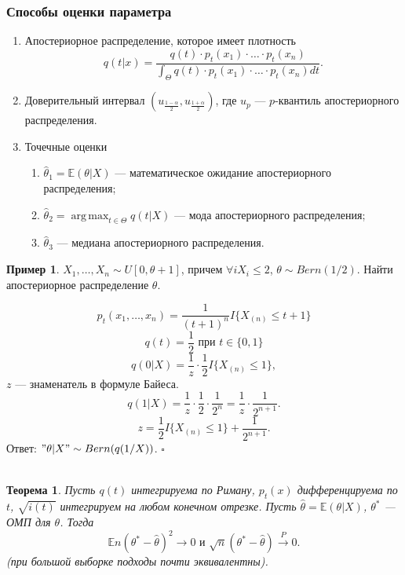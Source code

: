 \documentclass[12pt]{report}
\DeclareMathOperator*{\argmax}{arg\,max}
\newenvironment{solution}{{\bfseries Решение:}}{$\square$\\\\}
\newtheorem{theorem}{Теорема}
\theoremstyle{definition}
\newtheorem{example}{Пример}
\begin{document}
\subsubsection{Способы оценки параметра}
\begin{enumerate}
	\item Апостериорное распределение, которое имеет плотность $$q(t|x) = \dfrac{q(t)\cdot p_t(x_1)\cdot \ldots \cdot p_t(x_n)}{\displaystyle{\int_\Theta} q(t)\cdot p_t(x_1)\cdot \ldots \cdot p_t(x_n)dt}.$$
	\item Доверительный интервал $(u_{\frac{1-\alpha}{2}}, u_{\frac{1+\alpha}{2}})$, где $u_p$ — $p$-квантиль апостериорного распределения.
	\item Точечные оценки
	\begin{enumerate}
		\item $\hat{\theta}_1 = \mathbb{E}(\theta | X)$ — математическое ожидание апостериорного распределения;
		\item $\hat{\theta}_2 = \displaystyle{\argmax_{t \in \Theta}} q(t|X)$ — мода апостериорного распределения;
		\item $\hat{\theta}_3$ — медиана апостериорного распределения.
	\end{enumerate}
\end{enumerate}
\begin{example}
	$X_1, \ldots, X_n \sim U[0, \theta + 1]$, причем $\forall i X_i \leqslant 2$, $\theta \sim Bern(1/2)$. Найти апостериорное распределение $\theta$.
\end{example}
\begin{solution}
	$$p_t(x_1, \ldots, x_n) = \dfrac{1}{(t+1)^n}I\{X_{(n)}\leqslant t + 1\}$$
	$$q(t) = \dfrac{1}{2} \text{ при } t \in \{0, 1\}$$
	$$q(0|X) = \dfrac{1}{z} \cdot \dfrac{1}{2} I\{X_{(n)} \leqslant 1\},$$
	$z$ — знаменатель в формуле Байеса.
	$$q(1|X) = \dfrac{1}{z} \cdot \dfrac{1}{2} \cdot \dfrac{1}{2^n} = \dfrac{1}{z} \cdot \dfrac{1}{2^{n+1}}.$$
	$$z = \dfrac{1}{2}I\{X_{(n)} \leqslant 1\} + \dfrac{1}{2^{n+1}}.$$
	Ответ: $"\theta|X" \sim Bern(q(1/X))$.
\end{solution}
\begin{theorem}
	Пусть $q(t)$ интегрируема по Риману, $p_t(x)$ дифференцируема по $t$, $\sqrt{i(t)}$ интегрируем на любом конечном отрезке. Пусть $\hat{\theta} = \mathbb{E}(\theta|X)$, $\theta^*$ — ОМП для $\theta$. Тогда
	$$\mathbb{E} n(\theta^* - \hat{\theta})^2 \rightarrow 0 \text{ и } \sqrt{n}(\theta^* - \hat{\theta}) \xrightarrow{P} 0.$$
	(при большой выборке подходы почти эквивалентны).
\end{theorem}
\end{document}
